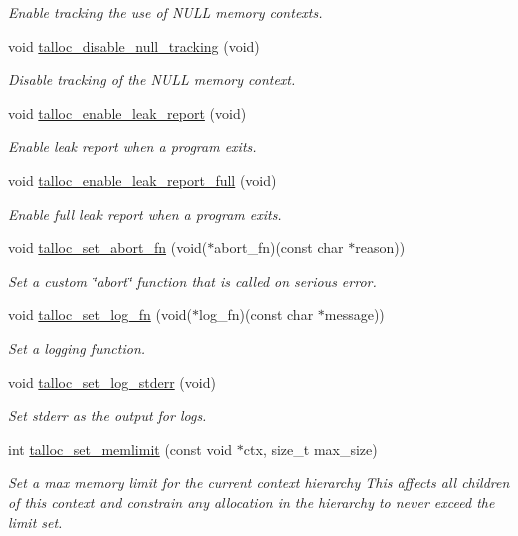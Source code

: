 \begin{DoxyCompactItemize}
\begin{DoxyCompactList}\small\item\em Enable tracking the use of N\+U\+L\+L memory contexts. \end{DoxyCompactList}\item 
void \hyperlink{group__talloc__debug_ga2d7d9d0b7c8ca726c537080f20de97e1}{talloc\+\_\+disable\+\_\+null\+\_\+tracking} (void)
\begin{DoxyCompactList}\small\item\em Disable tracking of the N\+U\+L\+L memory context. \end{DoxyCompactList}\item 
void \hyperlink{group__talloc__debug_gac6f0c065b4ed391acb5c74240a8647bc}{talloc\+\_\+enable\+\_\+leak\+\_\+report} (void)
\begin{DoxyCompactList}\small\item\em Enable leak report when a program exits. \end{DoxyCompactList}\item 
void \hyperlink{group__talloc__debug_gab01ab00014902d25e9eaba9fd172821c}{talloc\+\_\+enable\+\_\+leak\+\_\+report\+\_\+full} (void)
\begin{DoxyCompactList}\small\item\em Enable full leak report when a program exits. \end{DoxyCompactList}\item 
void \hyperlink{group__talloc__debug_ga37273c95255f727c2e50be93ffe8d90d}{talloc\+\_\+set\+\_\+abort\+\_\+fn} (void($\ast$abort\+\_\+fn)(const char $\ast$reason))
\begin{DoxyCompactList}\small\item\em Set a custom \char`\"{}abort\char`\"{} function that is called on serious error. \end{DoxyCompactList}\item 
void \hyperlink{group__talloc__debug_ga5694661cc56931d6edfd926043e43cce}{talloc\+\_\+set\+\_\+log\+\_\+fn} (void($\ast$log\+\_\+fn)(const char $\ast$message))
\begin{DoxyCompactList}\small\item\em Set a logging function. \end{DoxyCompactList}\item 
void \hyperlink{group__talloc__debug_ga28b5f73a0dc144abc1c4a231d2d2842f}{talloc\+\_\+set\+\_\+log\+\_\+stderr} (void)
\begin{DoxyCompactList}\small\item\em Set stderr as the output for logs. \end{DoxyCompactList}\item 
int \hyperlink{group__talloc__debug_ga28e83930f76844782e500a6041a2d452}{talloc\+\_\+set\+\_\+memlimit} (const void $\ast$ctx, size\+\_\+t max\+\_\+size)
\begin{DoxyCompactList}\small\item\em Set a max memory limit for the current context hierarchy This affects all children of this context and constrain any allocation in the hierarchy to never exceed the limit set. \end{DoxyCompactList}\end{DoxyCompactItemize}


